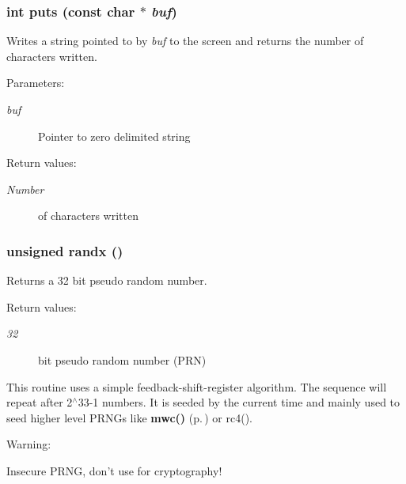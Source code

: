 \subsubsection{\setlength{\rightskip}{0pt plus 5cm}int puts (const char $\ast$ {\em buf})}\label{hpconio_8h_a1}


Writes a string pointed to by {\em buf} to the screen and returns the number of characters written.

\begin{Desc}
\item[Parameters: ]\par
\begin{description}
\item[{\em 
buf}]Pointer to zero delimited string \end{description}
\end{Desc}
\begin{Desc}
\item[Return values: ]\par
\begin{description}
\item[{\em 
Number}]of characters written \end{description}
\end{Desc}
\subsubsection{\setlength{\rightskip}{0pt plus 5cm}unsigned randx ()}\label{hpconio_8h_a7}


Returns a 32 bit pseudo random number.

\begin{Desc}
\item[Return values: ]\par
\begin{description}
\item[{\em 
32}]bit pseudo random number (PRN)\end{description}
\end{Desc}
This routine uses a simple feedback-shift-register algorithm. The sequence will repeat after 2$^\wedge$33-1 numbers. It is seeded by the current time and mainly used to seed higher level PRNGs like {\bf mwc()} {\rm (p.\,\pageref{hpmath_8h_a47})} or rc4().

\begin{Desc}
\item[Warning: ]\par
Insecure PRNG, don't use for cryptography! \end{Desc}
